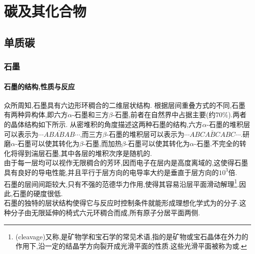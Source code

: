 \documentclass[draft]{ctexart}
\begin{document}
\section{碳及其化合物}
\subsection{单质碳}
\subsubsection{石墨}
\paragraph{石墨的结构,性质与反应}
众所周知,石墨具有六边形环稠合的二维层状结构.
根据层间重叠方式的不同,石墨有两种异构体,即六方$\alpha$-石墨和三方$\beta$-石墨,前者在自然界中占据主要(约$70\%$).两者的晶体结构如下所示.
从密堆积的角度描述这两种石墨的结构,六方$\alpha$-石墨的堆积层可以表示为$\cdots AB\overline{AB}AB\cdots$,而三方$\beta$-石墨的堆积层可以表示为$\cdots ABC\overline{ABC}ABC\cdots$.研磨$\alpha$-石墨可以使其转化为$\beta$-石墨,而加热$\beta$-石墨可以使其转化为$\alpha$-石墨.不完全的转化将得到湍层石墨,其中各层的堆积次序是随机的.\\
\indent 由于每一层均可以视作无限稠合的芳环,因而电子在层内是高度离域的,这使得石墨具有良好的导电性能,并且平行于层方向的电导率大约是垂直于层方向的$10^3$倍.\\
\indent 石墨的层间间距较大,只有不强的范德华力作用,使得其容易沿层平面滑动解理\footnote{(cleavage)又称,是矿物学和宝石学的常见术语,指的是矿物或宝石晶体在外力的作用下,沿一定的结晶学方向裂开成光滑平面的性质.这些光滑平面被称为或.}.因此,石墨的硬度很低.\\
\indent 石墨的独特的层状结构使得它与反应时控制条件就能形成理想化学式为的分子.这种分子由无限延伸的椅式六元环稠合而成,所有原子分居平面两侧.
\end{document}
